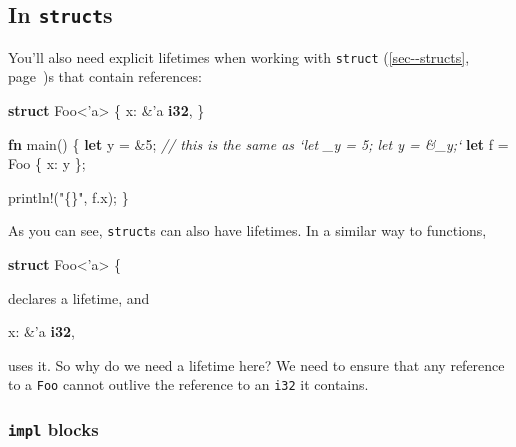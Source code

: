 \documentclass[a4paper,]{book}
\renewcommand*{\hyperref}[2][\ar]{%
  \def\ar{#2}%
  #2 (\autoref{#1}, page~\pageref{#1})}
\newenvironment{Shaded}{\begin{snugshade}}{\end{snugshade}}
\newcommand{\KeywordTok}[1]{\textcolor[rgb]{0.13,0.29,0.53}{\textbf{{#1}}}}
\newcommand{\DecValTok}[1]{\textcolor[rgb]{0.00,0.00,0.81}{{#1}}}
\newcommand{\StringTok}[1]{\textcolor[rgb]{0.31,0.60,0.02}{{#1}}}
\newcommand{\CommentTok}[1]{\textcolor[rgb]{0.56,0.35,0.01}{\textit{{#1}}}}
\newcommand{\OtherTok}[1]{\textcolor[rgb]{0.56,0.35,0.01}{{#1}}}
\newcommand{\NormalTok}[1]{{#1}}
\begin{document}
\subsection{\texorpdfstring{In
\texttt{struct}s}{In structs}}\label{in-structs}

You'll also need explicit lifetimes when working with
\hyperref[sec--structs]{\texttt{struct}}s that contain references:

\begin{Shaded}
\begin{Highlighting}[]
\KeywordTok{struct} \NormalTok{Foo<}\OtherTok{'a}\NormalTok{> \{}
    \NormalTok{x: &}\OtherTok{'a} \KeywordTok{i32}\NormalTok{,}
\NormalTok{\}}

\KeywordTok{fn} \NormalTok{main() \{}
    \KeywordTok{let} \NormalTok{y = &}\DecValTok{5}\NormalTok{; }\CommentTok{// this is the same as `let _y = 5; let y = &_y;`}
    \KeywordTok{let} \NormalTok{f = Foo \{ x: y \};}

    \OtherTok{println!}\NormalTok{(}\StringTok{"\{\}"}\NormalTok{, f.x);}
\NormalTok{\}}
\end{Highlighting}
\end{Shaded}

As you can see, \texttt{struct}s can also have lifetimes. In a similar
way to functions,

\begin{Shaded}
\begin{Highlighting}[]
\KeywordTok{struct} \NormalTok{Foo<}\OtherTok{'a}\NormalTok{> \{}
\end{Highlighting}
\end{Shaded}

declares a lifetime, and

\begin{Shaded}
\begin{Highlighting}[]
\NormalTok{x: &}\OtherTok{'a} \KeywordTok{i32}\NormalTok{,}
\end{Highlighting}
\end{Shaded}

uses it. So why do we need a lifetime here? We need to ensure that any
reference to a \texttt{Foo} cannot outlive the reference to an
\texttt{i32} it contains.

\subsubsection{\texorpdfstring{\texttt{impl}
blocks}{impl blocks}}\label{impl-blocks}
\end{document}
